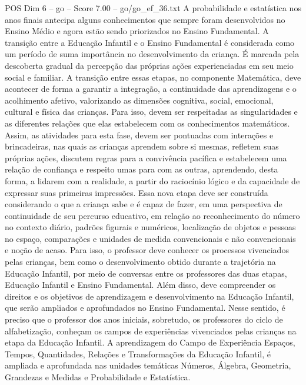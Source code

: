 \begin{textsample}{POS Dim 6 – go – Score 7.00 – go/go\_ef\_36.txt}
A probabilidade e estatística nos anos finais antecipa alguns conhecimentos que sempre foram desenvolvidos no Ensino Médio e agora estão sendo priorizados no Ensino Fundamental.
A transição entre a Educação Infantil e o Ensino Fundamental é considerada como um período de suma importância no desenvolvimento da criança.
É marcada pela descoberta gradual da percepção das próprias ações experienciadas em seu meio social e familiar.
A transição entre essas etapas, no componente Matemática, deve acontecer de forma a garantir a integração, a continuidade das aprendizagens e o acolhimento afetivo, valorizando as dimensões cognitiva, social, emocional, cultural e física das crianças.
Para isso, devem ser respeitadas as singularidades e as diferentes relações que elas estabelecem com os conhecimentos matemáticos.
Assim, as atividades para esta fase, devem ser pontuadas com interações e brincadeiras, nas quais as crianças aprendem sobre si mesmas, refletem suas próprias ações, discutem regras para a convivência pacífica e estabelecem uma relação de confiança e respeito umas para com as outras, aprendendo, desta forma, a lidarem com a realidade, a partir do raciocínio lógico e da capacidade de expressar suas primeiras impressões.
Essa nova etapa deve ser construída considerando o que a criança sabe e é capaz de fazer, em uma perspectiva de continuidade de seu percurso educativo, em relação ao reconhecimento do número no contexto diário, padrões figurais e numéricos, localização de objetos e pessoas no espaço, comparações e unidades de medida convencionais e não convencionais e noção de acaso.
Para isso, o professor deve conhecer os processos vivenciados pelas crianças, bem como o desenvolvimento obtido durante a trajetória na Educação Infantil, por meio de conversas entre os professores das duas etapas, Educação Infantil e Ensino Fundamental.
Além disso, deve compreender os direitos e os objetivos de aprendizagem e desenvolvimento na Educação Infantil, que serão ampliados e aprofundados no Ensino Fundamental.
Nesse sentido, é preciso que o professor dos anos iniciais, sobretudo, os professores do ciclo de alfabetização, conheçam os campos de experiências vivenciados pelas crianças na etapa da Educação Infantil.
A aprendizagem do Campo de Experiência Espaços, Tempos, Quantidades, Relações e Transformações da Educação Infantil, é ampliada e aprofundada nas unidades temáticas Números, Álgebra, Geometria, Grandezas e Medidas e Probabilidade e Estatística.

\end{textsample}
